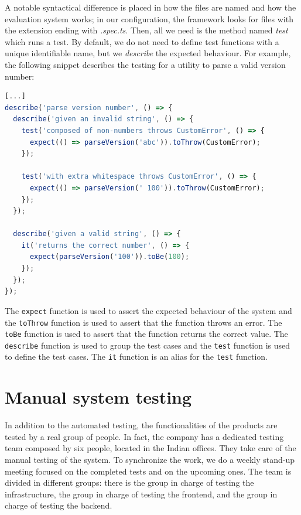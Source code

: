 A notable syntactical difference is placed in how the files are named and how the evaluation system works; in our configuration, the framework looks for files with the extension ending with \textit{.spec.ts}. Then, all we need is the method named \textit{test} which runs a test. By default, we do not need to define test functions with a unique identifiable name, but we \textit{describe} the expected behaviour. For example, the following snippet describes the testing for a utility to parse a valid version number:

\begin{lstlisting}[language=Javascript, caption={Jest testing framework example file parsing.spec.ts}]
[...]
describe('parse version number', () => {
  describe('given an invalid string', () => {
    test('composed of non-numbers throws CustomError', () => {
      expect(() => parseVersion('abc')).toThrow(CustomError);
    });

    test('with extra whitespace throws CustomError', () => {
      expect(() => parseVersion(' 100')).toThrow(CustomError);
    });
  });

  describe('given a valid string', () => {
    it('returns the correct number', () => {
      expect(parseVersion('100')).toBe(100);
    });
  });
});
\end{lstlisting}

The \texttt{expect} function is used to assert the expected behaviour of the system and the \texttt{toThrow} function is used to assert that the function throws an error. The \texttt{toBe} function is used to assert that the function returns the correct value. The \texttt{describe} function is used to group the test cases and the \texttt{test} function is used to define the test cases. The \texttt{it} function is an alias for the \texttt{test} function.

\section{Manual system testing}

In addition to the automated testing, the functionalities of the products are tested by a real group of people. In fact, the company has a dedicated testing team composed by six people, located in the Indian offices. They take care of the manual testing of the system. To synchronize the work, we do a weekly stand-up meeting focused on the completed tests and on the upcoming ones. The team is divided in different groups: there is the group in charge of testing the infrastructure, the group in charge of testing the frontend, and the group in charge of testing the backend.

